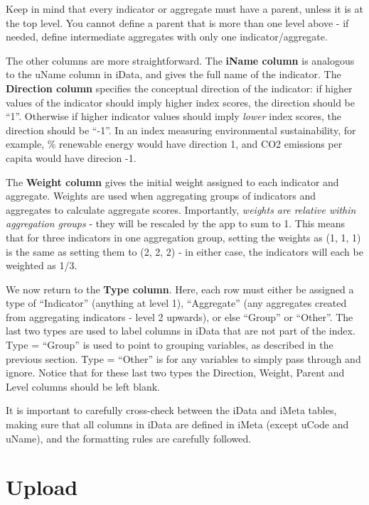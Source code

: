 \documentclass[
  letterpaper,
  DIV=11,
  numbers=noendperiod]{scrreprt}
\begin{document}
Keep in mind that every indicator or aggregate must have a parent,
unless it is at the top level. You cannot define a parent that is more
than one level above - if needed, define intermediate aggregates with
only one indicator/aggregate.

The other columns are more straightforward. The \textbf{iName column} is
analogous to the uName column in iData, and gives the full name of the
indicator. The \textbf{Direction column} specifies the conceptual
direction of the indicator: if higher values of the indicator should
imply higher index scores, the direction should be ``1''. Otherwise if
higher indicator values should imply \emph{lower} index scores, the
direction should be ``-1''. In an index measuring environmental
sustainability, for example, \% renewable energy would have direction 1,
and CO2 emissions per capita would have direcion -1.

The \textbf{Weight column} gives the initial weight assigned to each
indicator and aggregate. Weights are used when aggregating groups of
indicators and aggregates to calculate aggregate scores. Importantly,
\emph{weights are relative within aggregation groups} - they will be
rescaled by the app to sum to 1. This means that for three indicators in
one aggregation group, setting the weights as (1, 1, 1) is the same as
setting them to (2, 2, 2) - in either case, the indicators will each be
weighted as 1/3.

We now return to the \textbf{Type column}. Here, each row must either be
assigned a type of ``Indicator'' (anything at level 1), ``Aggregate''
(any aggregates created from aggregating indicators - level 2 upwards),
or else ``Group'' or ``Other''. The last two types are used to label
columns in iData that are not part of the index. Type = ``Group'' is
used to point to grouping variables, as described in the previous
section. Type = ``Other'' is for any variables to simply pass through
and ignore. Notice that for these last two types the Direction, Weight,
Parent and Level columns should be left blank.

It is important to carefully cross-check between the iData and iMeta
tables, making sure that all columns in iData are defined in iMeta
(except uCode and uName), and the formatting rules are carefully
followed.

\hypertarget{upload}{%
\section{Upload}\label{upload}}
\end{document}
